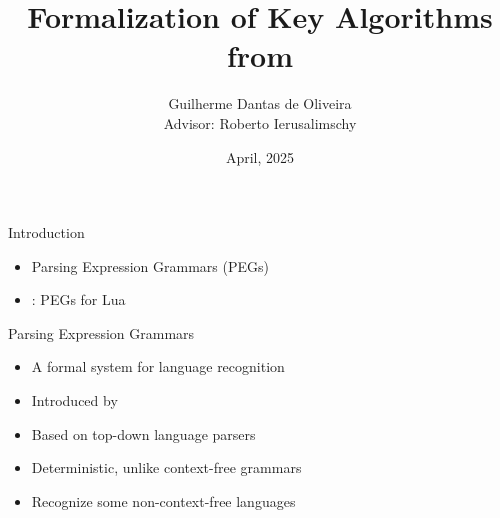 \documentclass{beamer}
\title[Master's Thesis Defense]%
{Formalization of Key Algorithms from \lpeg{}}
\author[Guilherme Dantas]
{Guilherme Dantas de Oliveira \texorpdfstring{\\ \vspace{10pt}}{and}
\footnotesize Advisor: Roberto Ierusalimschy}
\institute[PUC-Rio]%
{Pontifical Catholic University of Rio de Janeiro}
\date{April, 2025}
\begin{document}
\begin{frame}
    \titlepage
\end{frame}

\begin{frame}{Introduction}
    \begin{itemize}
        \item Parsing Expression Grammars (PEGs)
        \item \lpeg{}: PEGs for Lua
    \end{itemize}
\end{frame}

\begin{frame}{Parsing Expression Grammars}
    \begin{itemize}
        \item A formal system for language recognition
        \item Introduced by \cite{ford_parsing_2004}
        \item Based on top-down language parsers
        \item Deterministic, unlike context-free grammars
        \item Recognize some non-context-free languages
    \end{itemize}
\end{frame}

\end{document}
